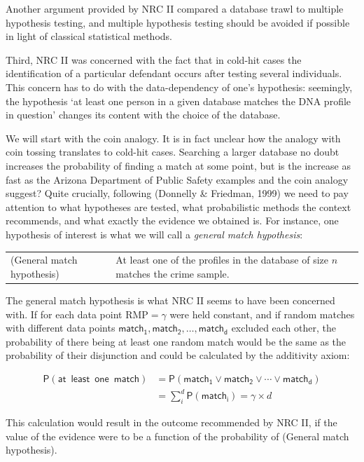 \documentclass[10pt,dvipsnames,enabledeprecatedfontcommands]{scrartcl}
\newcommand{\pr}[1]{\mathsf{P}(#1)}
\begin{document}
Another argument provided by NRC II compared a database trawl to
multiple hypothesis testing, and multiple hypothesis testing should be
avoided if possible in light of classical statistical methods.

Third, NRC II was concerned with the fact that in cold-hit cases the
identification of a particular defendant occurs after testing several
individuals. This concern has to do with the data-dependency of one's
hypothesis: seemingly, the hypothesis `at least one person in a given
database matches the DNA profile in question' changes its content with
the choice of the database.

We will start with the coin analogy. It is in fact unclear how the
analogy with coin tossing translates to cold-hit cases. Searching a
larger database no doubt increases the probability of finding a match at
some point, but is the increase as fast as the Arizona Department of
Public Safety examples and the coin analogy suggest? Quite crucially,
following (Donnelly \& Friedman, 1999) we need to pay attention to what
hypotheses are tested, what probabilistic methods the context
recommends, and what exactly the evidence we obtained is. For instance,
one hypothesis of interest is what we will call a
\emph{general match hypothesis}: \vspace{1mm}

\begin{tabular}{lp{8cm}}
(General match hypothesis) &
At least one of the profiles in the database of size $n$ 
matches the crime sample.
\end{tabular}

\vspace{1mm} \noindent The general match hypothesis is what NRC II seems
to have been concerned with. If for each data point RMP\(=\gamma\) were
held constant, and if random matches with different data points
\(\mathsf{match_1, match_2, \dots, match_d}\) excluded each other, the
probability of there being at least one random match would be the same
as the probability of their disjunction and could be calculated by the
additivity axiom:

\begin{align*}
\pr{\mathsf{at\,\,\, least\,\,\, one\,\,\, match}} & = \pr{\mathsf{match_1} \vee \mathsf{match_2} \vee \cdots \vee \mathsf{match_d}} \\
& = \sum_{i}^d \pr{\mathsf{match_i}} = \gamma \times d
\end{align*}

This calculation would result in the outcome recommended by NRC II, if
the value of the evidence were to be a function of the probability of
(General match hypothesis).
\end{document}
